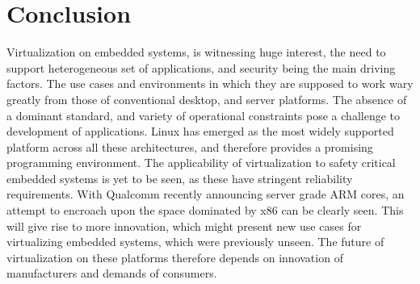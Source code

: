 \documentclass[seminar,twoside]{iitbreport}
\begin{document}
\section{Conclusion}
Virtualization on embedded systems, is witnessing huge interest, the need to support heterogeneous set of applications, and security being the main driving factors.
The use cases and environments in which they are supposed to work wary greatly from those of conventional desktop, and server platforms. The absence of a dominant standard,
and variety of operational constraints pose a challenge to development of applications. Linux has emerged as the most widely supported platform across all these
architectures, and therefore provides a promising programming environment. The applicability of virtualization to safety critical embedded systems is yet to be seen, as these
have stringent reliability requirements. With Qualcomm recently announcing server grade ARM cores, an attempt to encroach upon the space dominated by x86 can be clearly seen.
This will give rise to more innovation, which might present new use cases for virtualizing embedded systems, which were previously unseen. The future of virtualization
on these platforms therefore depends on innovation of manufacturers and demands of consumers.
\clearpage
{}


\end{document}
